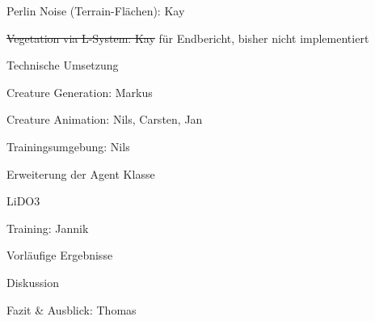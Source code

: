 \begin{thallok}
\begin{thallok}
\begin{thallok}
			\item Perlin Noise (Terrain-Flächen): Kay
			\item \sout{Vegetation via L-System: Kay} für Endbericht, bisher nicht implementiert
		\end{thallok}
	\end{thallok}
	\item Technische Umsetzung
	\begin{thallok}
		\item Creature Generation: Markus
		\item Creature Animation: Nils, Carsten, Jan
		\begin{thallok}
			\item Trainingsumgebung: Nils
			\item Erweiterung der Agent Klasse
			\item LiDO3
			\item Training: Jannik
		\end{thallok}
	\end{thallok}
	\item Vorläufige Ergebnisse
	\begin{thallok}
		\item Diskussion
	\end{thallok}
	\item Fazit \& Ausblick: Thomas
\end{thallok}

